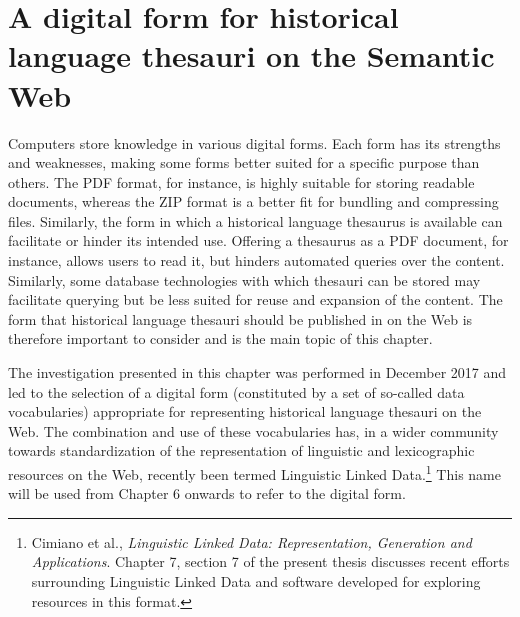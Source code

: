 \chapter{A digital form for historical language thesauri on the Semantic Web}

Computers store knowledge in various digital forms. Each form has its strengths and weaknesses, making some forms better suited for a specific purpose than others. The PDF format, for instance, is highly suitable for storing readable documents, whereas the ZIP format is a better fit for bundling and compressing files. Similarly, the form in which a historical language thesaurus is available can facilitate or hinder its intended use. Offering a thesaurus as a PDF document, for instance, allows users to read it, but hinders automated queries over the content. Similarly, some database technologies with which thesauri can be stored may facilitate querying but be less suited for reuse and expansion of the content. The form that historical language thesauri should be published in on the Web is therefore important to consider and is the main topic of this chapter.

The investigation presented in this chapter was performed in December 2017 and led to the selection of a digital form (constituted by a set of so-called data vocabularies) appropriate for representing historical language thesauri on the Web. The combination and use of these vocabularies has, in a wider community towards standardization of the representation of linguistic and lexicographic resources on the Web, recently been termed Linguistic Linked Data.\footnote{Cimiano et al., \textit{Linguistic Linked Data: Representation, Generation and Applications}. Chapter 7, section 7 of the present thesis discusses recent efforts surrounding Linguistic Linked Data and software developed for exploring resources in this format.} This name will be used from Chapter 6 onwards to refer to the digital form.

